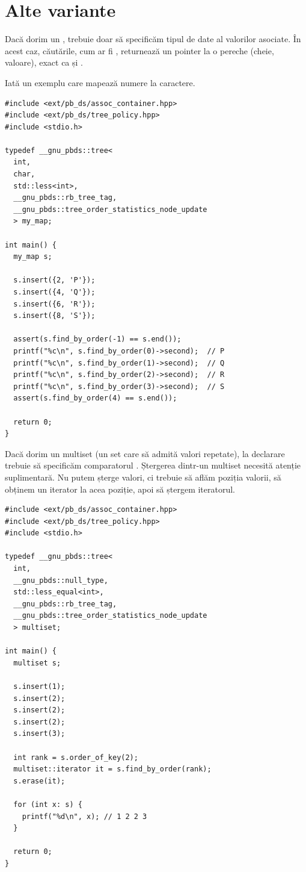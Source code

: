 \documentclass[../main.tex]{subfiles}
\begin{document}
\section{Alte variante}

Dacă dorim un , trebuie doar să specificăm tipul de date al valorilor asociate. În acest caz, căutările, cum ar fi , returnează un pointer la o pereche (cheie, valoare), exact ca și .

Iată un exemplu care mapează numere la caractere.

\begin{verbatim}
#include <ext/pb_ds/assoc_container.hpp>
#include <ext/pb_ds/tree_policy.hpp>
#include <stdio.h>

typedef __gnu_pbds::tree<
  int,
  char,
  std::less<int>,
  __gnu_pbds::rb_tree_tag,
  __gnu_pbds::tree_order_statistics_node_update
  > my_map;

int main() {
  my_map s;

  s.insert({2, 'P'});
  s.insert({4, 'Q'});
  s.insert({6, 'R'});
  s.insert({8, 'S'});

  assert(s.find_by_order(-1) == s.end());
  printf("%c\n", s.find_by_order(0)->second);  // P
  printf("%c\n", s.find_by_order(1)->second);  // Q
  printf("%c\n", s.find_by_order(2)->second);  // R
  printf("%c\n", s.find_by_order(3)->second);  // S
  assert(s.find_by_order(4) == s.end());

  return 0;
}
\end{verbatim}

Dacă dorim un multiset (un set care să admită valori repetate), la declarare trebuie să specificăm comparatorul . Ștergerea dintr-un multiset necesită atenție suplimentară. Nu putem șterge valori, ci trebuie să aflăm poziția valorii, să obținem un iterator la acea poziție, apoi să ștergem iteratorul.

\begin{verbatim}
#include <ext/pb_ds/assoc_container.hpp>
#include <ext/pb_ds/tree_policy.hpp>
#include <stdio.h>

typedef __gnu_pbds::tree<
  int,
  __gnu_pbds::null_type,
  std::less_equal<int>,
  __gnu_pbds::rb_tree_tag,
  __gnu_pbds::tree_order_statistics_node_update
  > multiset;

int main() {
  multiset s;

  s.insert(1);
  s.insert(2);
  s.insert(2);
  s.insert(2);
  s.insert(3);

  int rank = s.order_of_key(2);
  multiset::iterator it = s.find_by_order(rank);
  s.erase(it);

  for (int x: s) {
    printf("%d\n", x); // 1 2 2 3
  }

  return 0;
}
\end{verbatim}
\end{document}
